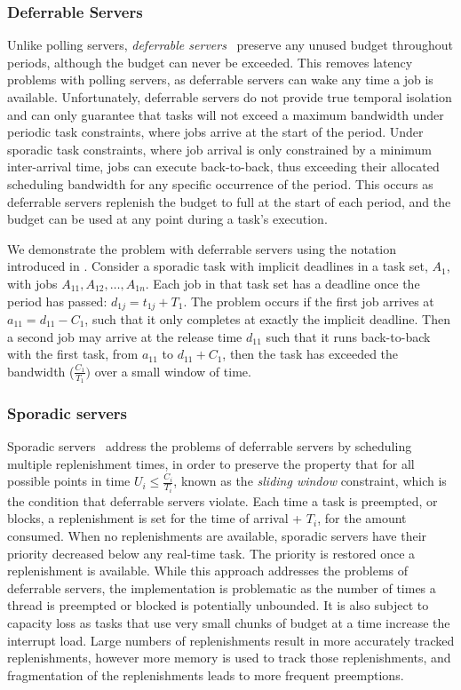 \subsubsection{Deferrable Servers}
\label{p:ds} 

Unlike polling servers, \emph{deferrable
servers}~\citep{Lehoczky_LS_87, Strosnider_LS_95} preserve any unused budget throughout periods, although
the budget can never be exceeded.  This removes latency problems with polling servers, as deferrable
servers can wake any time a job is available. Unfortunately, deferrable servers do not provide 
true temporal isolation and can only guarantee that tasks will not exceed a maximum bandwidth under
periodic task constraints, where jobs arrive at the start of the period.
Under sporadic task constraints, where job arrival is only constrained by a minimum inter-arrival
time, jobs can execute back-to-back, thus exceeding their allocated scheduling bandwidth for any specific occurrence of
the period.  This occurs as deferrable servers replenish the budget to full at the start of each
period, and the budget can be used at any point during a task's execution. 

We demonstrate the problem with deferrable servers using the notation introduced in
. Consider a sporadic task with implicit deadlines in a task set, 
$A_{1}$, with jobs $A_{11}, A_{12}, \ldots, A_{1n}$. Each job in that task set has a deadline once the
period has passed: $d_{1j} = t_{1j} + T_{1}$. The problem occurs if the first job arrives at $a_{11}
= d_{11}-C_{1}$, such that it only completes at exactly the implicit deadline.  
Then a second job may arrive at the release time $d_{11}$ such that it runs back-to-back with the first
task, from $a_11$ to $d_{11} + C_{1}$, then the task has exceeded the bandwidth 
($\frac{C_{1}}{T_{1}})$ over a small window of time. 

\subsubsection{Sporadic servers}
\label{p:sporadic} 

Sporadic servers~\citep{Sprunt_SL_89a} address the problems of
deferrable servers by scheduling multiple replenishment times, in order to preserve the property
that for all possible points in time $U_{i} \leq \frac{C_{i}}{T_{i}}$, known as the \emph{sliding window} constraint, which
is the condition that deferrable servers violate.  Each time a task is preempted, or blocks, a
replenishment is set for the time of arrival + $T_{i}$, for the amount consumed.  When no replenishments are
available, sporadic servers have their priority decreased below any real-time task.  The priority is
restored once a replenishment is available.  While this approach addresses the problems of deferrable
servers, the implementation is problematic as the number of times a thread is preempted or blocked
is potentially unbounded.  It is also subject to capacity loss as tasks that use very small chunks
of budget at a time increase the interrupt load.  Large numbers of replenishments result in more
accurately tracked replenishments, however more memory is used to track those replenishments, and
fragmentation of the replenishments leads to more frequent preemptions.

